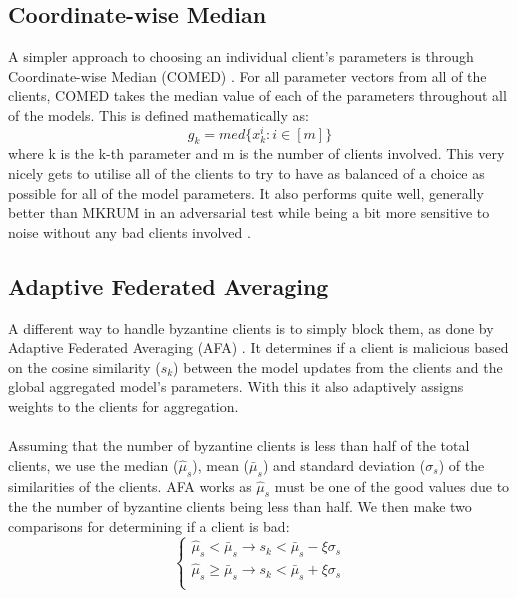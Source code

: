 \subsection{Coordinate-wise Median}
A simpler approach to choosing an individual client's parameters is through Coordinate-wise Median (COMED) \cite{comed}.
For all parameter vectors from all of the clients, COMED takes the median value of each of the parameters throughout all of the models.
This is defined mathematically as:
\begin{equation}
    g_k = med\{x_k^i: i \in [m]\}
\end{equation}
where k is the k-th parameter and m is the number of clients involved.
This very nicely gets to utilise all of the clients to try to have as balanced of a choice as possible for all of the model parameters.
It also performs quite well, generally better than MKRUM in an adversarial test while being a bit more sensitive to noise without any bad clients involved \cite{robagg_health}.

\subsection{Adaptive Federated Averaging}
A different way to handle byzantine clients is to simply block them, as done by Adaptive Federated Averaging (AFA) \cite{afa}.
It determines if a client is malicious based on the cosine similarity ($s_k$) between the model updates from the clients and the global aggregated model's parameters.
With this it also adaptively assigns weights to the clients for aggregation.
\\ \\
Assuming that the number of byzantine clients is less than half of the total clients, we use the median ($\hat{\mu}_s$), mean ($\bar{\mu}_s$) and standard deviation ($\sigma_s$) of the similarities of the clients. AFA works as $\hat{\mu}_s$ must be one of the good values due to the the number of byzantine clients being less than half. We then make two comparisons for determining if a client is bad:
\begin{equation}
    \begin{cases}
      \hat{\mu}_s < \bar{\mu}_s \longrightarrow s_k < \bar{\mu}_s - \xi \sigma_s\\
      \hat{\mu}_s \geq \bar{\mu}_s \longrightarrow s_k < \bar{\mu}_s + \xi \sigma_s\\
    \end{cases}
\end{equation}

